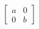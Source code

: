 \documentclass[preview]{standalone}
\begin{document}
\begin{align*}
\begin{bmatrix} a & 0 \\ 0 & b \end{bmatrix}
\end{align*}
\end{document}
